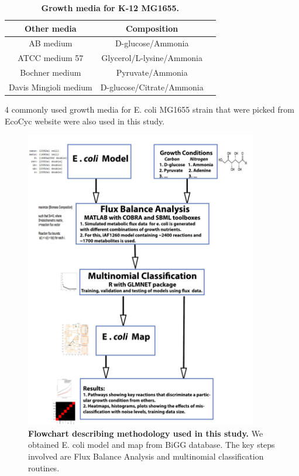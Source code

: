 \documentclass[12pt]{article}
\begin{document}
\begin{table}[!ht]
\caption{
\bf{Growth media for K-12 MG1655.}}
\begin{tabular}{|c|c|c|}
\hline \hline
Other media & Composition \\
\hline
AB medium &  D-glucose/Ammonia\\
ATCC medium 57 &  Glycerol/L-lysine/Ammonia\\
Bochner medium &  Pyruvate/Ammonia\\
Davis Mingioli medium & D-glucose/Citrate/Ammonia\\
\hline
\end{tabular}
\begin{flushleft}4 commonly used growth media for E. coli MG1655 strain that were picked from EcoCyc website were also used in this study.
\end{flushleft}
\label{tab:label}
 \end{table}


\clearpage
\begin{figure}[!ht]
\centerline{\includegraphics[width=4in]{Figures/flowchart_new.pdf}}
\caption{\label{fig:flowchart}\textbf{Flowchart describing methodology used in this study.} We obtained E. coli model and map from BiGG database. The key steps involved are Flux Balance Analysis and multinomial classification routines.}
\end{figure}
\end{document}
